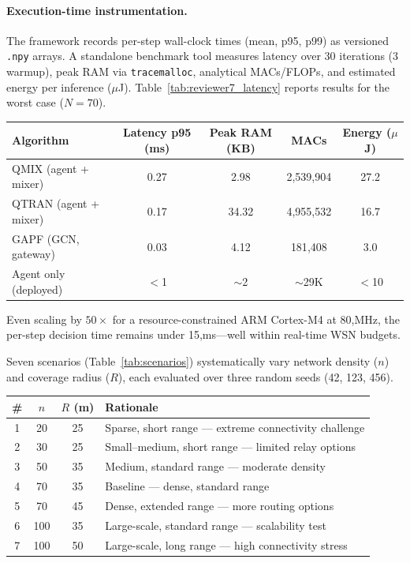 \documentclass[12pt, onecolumn, journal]{IEEEtran}
\newcounter{algorithm}
\newcounter{reviewer}
\begin{document}
\paragraph{Execution-time instrumentation.}
The framework records per-step wall-clock times (mean, p95, p99) as versioned \texttt{.npy} arrays. A standalone benchmark tool measures latency over 30 iterations (3 warmup), peak RAM via \texttt{tracemalloc}, analytical MACs/FLOPs, and estimated energy per inference ($\mu$J). Table~\ref{tab:reviewer7_latency} reports results for the worst case ($N{=}70$).

\begin{center}
\label{tab:reviewer7_latency}
\renewcommand{\arraystretch}{1.15}
\begin{tabular}{@{}lcccc@{}}
\toprule
\textbf{Algorithm} & \textbf{Latency p95 (ms)} & \textbf{Peak RAM (KB)} & \textbf{MACs} & \textbf{Energy ($\mu$J)} \\
\midrule
QMIX (agent + mixer)   & 0.27 & 2.98  & 2{,}539{,}904 & 27.2 \\
QTRAN (agent + mixer)   & 0.17 & 34.32 & 4{,}955{,}532 & 16.7 \\
GAPF (GCN, gateway)     & 0.03 & 4.12  & 181{,}408     & 3.0  \\
\midrule
Agent only (deployed)    & $<$1 & $\sim$2 & $\sim$29K  & $<$10 \\
\bottomrule
\end{tabular}
\end{center}

Even scaling by $50\times$ for a resource-constrained ARM Cortex-M4 at 80,MHz, the per-step decision time remains under 15,ms---well within real-time WSN budgets.

Seven scenarios (Table~\ref{tab:scenarios}) systematically vary network density ($n$) and coverage radius ($R$), each evaluated over three random seeds (42, 123, 456).

\begin{center}
\label{tab:scenarios}
\begin{tabular}{cccl}
\hline
\textbf{\#} & $n$ & $R$ (m) & \textbf{Rationale} \\
\hline
1 & 20  & 25 & Sparse, short range --- extreme connectivity challenge \\
2 & 30  & 25 & Small--medium, short range --- limited relay options \\
3 & 50  & 35 & Medium, standard range --- moderate density \\
4 & 70  & 35 & Baseline --- dense, standard range \\
5 & 70  & 45 & Dense, extended range --- more routing options \\
6 & 100 & 35 & Large-scale, standard range --- scalability test \\
7 & 100 & 50 & Large-scale, long range --- high connectivity stress \\
\hline
\end{tabular}
\end{center}
\end{document}
